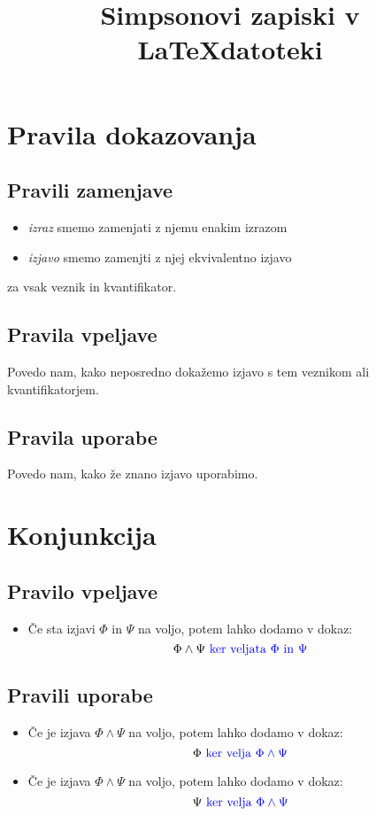 \documentclass[12pt,a4paper]{article}
\title{Simpsonovi zapiski v \LaTeX  \space  datoteki}
\newcommand{\blue}[1]{\textcolor{blue}{#1}}
\begin{document}
\maketitle

\newpage





\section{Pravila dokazovanja}
    \subsection*{Pravili zamenjave}
    \begin{itemize}
        \item \emph{izraz} smemo zamenjati z njemu enakim izrazom
        \item \emph{izjavo} smemo zamenjti z njej ekvivalentno izjavo
    \end{itemize}
    za vsak veznik in kvantifikator.

    \subsection*{Pravila vpeljave}
    Povedo nam, kako neposredno dokažemo izjavo s tem veznikom ali kvantifikatorjem.

    \subsection*{Pravila uporabe}
    Povedo nam, kako že znano izjavo uporabimo. 

\section{Konjunkcija}
    \subsection*{Pravilo vpeljave}
        \begin{itemize}
            \item Če sta izjavi $ \Phi $ in $ \Psi $ na voljo, potem lahko dodamo v dokaz:
            $$  \Phi \wedge \Psi \blue{\text{ ker veljata }  \Phi  \text{ in } \Psi}  $$
        \end{itemize}

    \subsection*{Pravili uporabe}
    \begin{itemize}
        \item Če je izjava $ \Phi \wedge \Psi $ na voljo, potem lahko dodamo v dokaz:
        $$ \Phi \blue{\text{ ker velja } \Phi \wedge \Psi } $$
        \item Če je izjava $ \Phi \wedge \Psi $ na voljo, potem lahko dodamo v dokaz:
        $$ \Psi \blue{\text{ ker velja } \Phi \wedge \Psi } $$
    \end{itemize}
\end{document}
